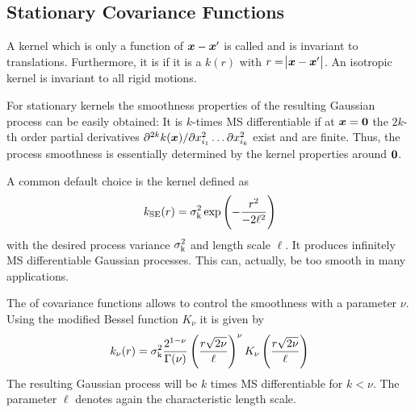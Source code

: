 
\subsection{Stationary Covariance Functions}
A kernel which is only a function of $\bm{x} - \bm{x}'$ is called 
 and is invariant to translations. Furthermore, it is 
 if it is a  $k(r)$ with 
    $r = \abs{\bm{x} - \bm{x}'}$.  An isotropic kernel is invariant to all rigid 
    motions.

For stationary kernels the smoothness properties of the resulting Gaussian 
process can be easily obtained: It is $k$-times MS differentiable if at $\bm{x} = \bm{0}$ the $2k$-th order partial derivatives $\partial^{2k} k(\bm{x}) 
/ \partial x_{i_1}^2 \dots \partial x_{i_k}^2$ exist and are finite. Thus, the 
process smoothness is essentially determined by the kernel properties around 
$\bm{0}$.

A common default choice is the  kernel 
    defined as
\begin{equation}
    k\ped{SE}(r) = \sigma\ped{k}^2 \exp\del{-\frac{r^2}{-2\ell^2}}
\end{equation}
with the desired process variance $\sigma_{\mathrm{k}}^2$ and length scale $\ell$. It 
produces infinitely MS differentiable Gaussian processes. This can, actually, be 
too smooth in many applications.

The  of covariance functions allows to control the 
smoothness with a parameter $\nu$. Using the modified Bessel function $K_{\nu}$ 
it is given by
\begin{equation}
    k_{\nu}(r) = \sigma\ped{k}^2 \frac{2^{1-\nu}}{\Gamma(\nu)} 
    \del{\frac{r\sqrt{2\nu}}{\ell}}^{\nu} K_{\nu} 
    \del{\frac{r\sqrt{2\nu}}{\ell}}
\end{equation}
The resulting Gaussian process will be $k$ times MS differentiable for $k 
< \nu$. The parameter $\ell$ denotes again the characteristic length scale.

